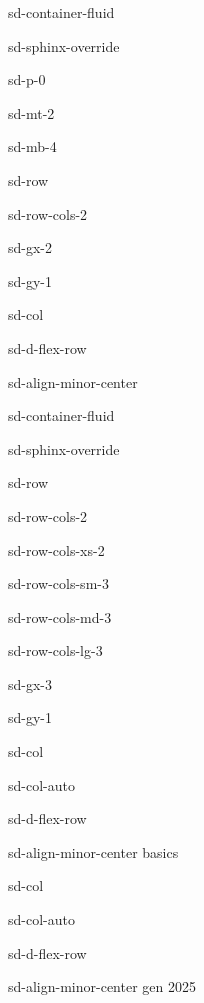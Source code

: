 \documentclass[letterpaper,10pt,italian]{jupyterBook}
\begin{document}
\begin{sphinxuseclass}{sd-container-fluid}
\begin{sphinxuseclass}{sd-sphinx-override}
\begin{sphinxuseclass}{sd-p-0}
\begin{sphinxuseclass}{sd-mt-2}
\begin{sphinxuseclass}{sd-mb-4}
\begin{sphinxuseclass}{sd-row}
\begin{sphinxuseclass}{sd-row-cols-2}
\begin{sphinxuseclass}{sd-gx-2}
\begin{sphinxuseclass}{sd-gy-1}
\begin{sphinxuseclass}{sd-col}
\begin{sphinxuseclass}{sd-d-flex-row}
\begin{sphinxuseclass}{sd-align-minor-center}
\begin{sphinxuseclass}{sd-container-fluid}
\begin{sphinxuseclass}{sd-sphinx-override}
\begin{sphinxuseclass}{sd-row}
\begin{sphinxuseclass}{sd-row-cols-2}
\begin{sphinxuseclass}{sd-row-cols-xs-2}
\begin{sphinxuseclass}{sd-row-cols-sm-3}
\begin{sphinxuseclass}{sd-row-cols-md-3}
\begin{sphinxuseclass}{sd-row-cols-lg-3}
\begin{sphinxuseclass}{sd-gx-3}
\begin{sphinxuseclass}{sd-gy-1}
\begin{sphinxuseclass}{sd-col}
\begin{sphinxuseclass}{sd-col-auto}
\begin{sphinxuseclass}{sd-d-flex-row}
\begin{sphinxuseclass}{sd-align-minor-center}
\sphinxAtStartPar
basics

\end{sphinxuseclass}
\end{sphinxuseclass}
\end{sphinxuseclass}
\end{sphinxuseclass}
\begin{sphinxuseclass}{sd-col}
\begin{sphinxuseclass}{sd-col-auto}
\begin{sphinxuseclass}{sd-d-flex-row}
\begin{sphinxuseclass}{sd-align-minor-center}
 gen 2025


\end{sphinxuseclass}
\end{sphinxuseclass}
\end{sphinxuseclass}
\end{sphinxuseclass}
\end{sphinxuseclass}
\end{sphinxuseclass}
\end{sphinxuseclass}
\end{sphinxuseclass}
\end{sphinxuseclass}
\end{sphinxuseclass}
\end{sphinxuseclass}
\end{sphinxuseclass}
\end{sphinxuseclass}
\end{sphinxuseclass}
\end{sphinxuseclass}
\end{sphinxuseclass}
\end{sphinxuseclass}
\end{sphinxuseclass}
\end{sphinxuseclass}
\end{sphinxuseclass}
\end{sphinxuseclass}
\end{sphinxuseclass}
\end{sphinxuseclass}
\end{sphinxuseclass}
\end{sphinxuseclass}
\end{sphinxuseclass}
\end{document}
